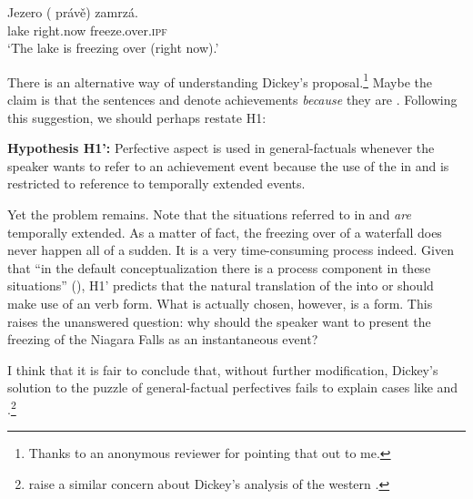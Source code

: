 \documentclass[output=paper,modfonts,newtxmath,hidelinks]{langscibook}
\begin{document}
\begin{exe}
\ex\label{13:jezoro}
\gll Jezero (\hspace{-2pt} pr\'av\v{e}) zamrz\'a. \\
lake {} right.now freeze.over.\textsc{ipf} \\
\glt `The lake is freezing over (right now).'
\end{exe}

\noindent There is an alternative way of understanding Dickey's proposal.\footnote{Thanks to an anonymous reviewer for pointing that out to me.} Maybe the claim is that 
the sentences  and  denote achievements \textit{because} they are . 
Following this suggestion, we should perhaps restate H1:  
\begin{exe}
\ex\label{13:hypo1bar}
\textbf{Hypothesis H1':} Perfective aspect is used in general-factuals whenever the speaker wants to refer to an achievement event because the use of the  in  and  is restricted to reference to temporally extended events.
\end{exe}

\noindent Yet the problem remains. Note that the situations referred to in  and  \textit{are} temporally extended. As a matter of fact, the freezing over of a waterfall does never happen all of a sudden. It is a very time-consuming process indeed. Given that ``in the default conceptualization there is a process component in these situations'' (\citealt[78]{Dickey18}), H1' predicts that the natural translation of the   into  or  should make use of an  verb form. What is actually chosen, however, is a  form. This raises the unanswered question: why should the speaker want to present the freezing of the Niagara Falls as an instantaneous event?    

I think that it is fair to conclude that, without further modification, Dickey's solution to the puzzle of general-factual perfectives fails to explain cases like  and .\footnote{\citet{FK15} raise a similar concern about Dickey's analysis of the western .}
\end{document}
